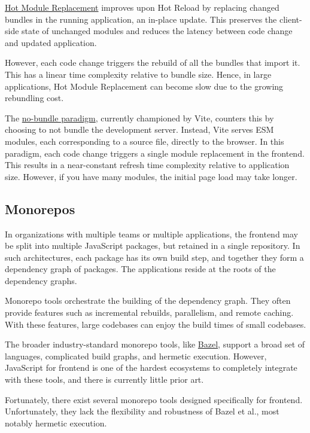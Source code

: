 \documentclass{article}
\begin{document}
\href{https://webpack.js.org/concepts/hot-module-replacement/}{Hot Module Replacement} improves upon
Hot Reload by replacing changed bundles in the running application, an in-place update. This
preserves the client-side state of unchanged modules and reduces the latency between code change and
updated application.

However, each code change triggers the rebuild of all the bundles that import it. This has a linear
time complexity relative to bundle size. Hence, in large applications, Hot Module Replacement can
become slow due to the growing rebundling cost.

The \href{https://vitejs.dev/guide/why.html}{no-bundle paradigm}, currently championed by Vite,
counters this by choosing to not bundle the development server. Instead, Vite serves ESM modules,
each corresponding to a source file, directly to the browser. In this paradigm, each code change
triggers a single module replacement in the frontend. This results in a near-constant refresh time
complexity relative to application size. However, if you have many modules, the initial page load
may take longer.

\subsection{Monorepos}

In organizations with multiple teams or multiple applications, the frontend may be split into
multiple JavaScript packages, but retained in a single repository. In such architectures, each
package has its own build step, and together they form a dependency graph of packages. The
applications reside at the roots of the dependency graphs.

Monorepo tools orchestrate the building of the dependency graph. They often provide features such as
incremental rebuilds, parallelism, and remote caching. With these features, large codebases can
enjoy the build times of small codebases.

The broader industry-standard monorepo tools, like  \href{https://bazel.build/}{Bazel}, support a
broad set of languages, complicated build graphs, and hermetic execution. However, JavaScript for
frontend is one of the hardest ecosystems to completely integrate with these tools, and there is
currently little prior art.

Fortunately, there exist several monorepo tools designed specifically for frontend. Unfortunately,
they lack the flexibility and robustness of Bazel et al., most notably hermetic execution.
\end{document}
